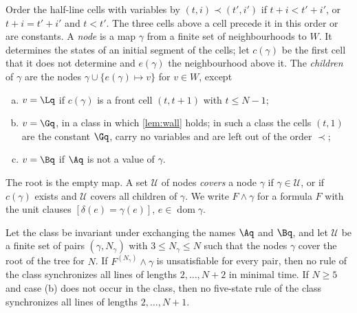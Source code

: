 Order the half-line cells with variables by $(t,i)\prec(t',i')$ if $t+i<t'+i'$,
or $t+i=t'+i'$ and $t<t'$. The three cells above a cell precede it in this
order or are constants. A \emph{node} is a map $\gamma$ from a finite set of
neighbourhoods to $W$. It determines the states of an initial segment of the
cells; let $c(\gamma)$ be the first cell that it does not determine and
$e(\gamma)$ the neighbourhood above it. The \emph{children} of $\gamma$ are the
nodes $\gamma\cup\{e(\gamma)\mapsto v\}$ for $v\in W$, except
\begin{enumerate}[(a)]
\item $v=\Lq$ if $c(\gamma)$ is a front cell $(t,t+1)$ with $t\le N-1$;
\item $v=\Gq$, in a class in which \cref{lem:wall} holds; in such a class the
cells $(t,1)$ are the constant $\Gq$, carry no variables and are left out of the
order $\prec$;
\item $v=\Bq$ if $\Aq$ is not a value of $\gamma$.
\end{enumerate}
The root is the empty map. A set $\mathcal U$ of nodes \emph{covers} a node
$\gamma$ if $\gamma\in\mathcal U$, or if $c(\gamma)$ exists and $\mathcal U$
covers all children of $\gamma$. We write $F\wedge\gamma$ for a formula $F$
with the unit clauses $[\delta(e)=\gamma(e)]$, $e\in\operatorname{dom}\gamma$.

\begin{lemma}\label{lem:split}
Let the class be invariant under exchanging the names $\Aq$ and $\Bq$, and let
$\mathcal U$ be a finite set of pairs $(\gamma,N_\gamma)$ with $3\le N_\gamma\le N$
such that the nodes $\gamma$ cover the root of the tree for $N$. If
$F^{(N_\gamma)}\wedge\gamma$ is unsatisfiable for every pair, then no rule of the
class synchronizes all lines of lengths $2,\dots,N+2$ in minimal time. If
$N\ge5$ and case \textup{(b)} does not occur in the class, then no five-state
rule of the class synchronizes all lines of lengths $2,\dots,N+1$.
\end{lemma}

